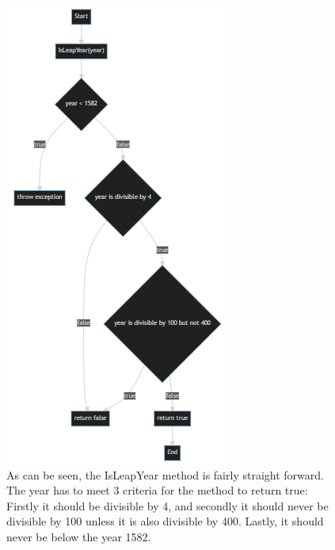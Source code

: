 \documentclass{article}
\begin{document}
\begin{figure}
    \centering
    \includegraphics{Flowchart.png}
    \caption{As can be seen, the IsLeapYear method is fairly straight forward. The year has to meet 3 criteria for the method to return true: Firstly it should be divisible by 4, and secondly it should never be divisible by 100 unless it is also divisible by 400. Lastly, it should never be below the year 1582.}
\end{figure}
\end{document}
